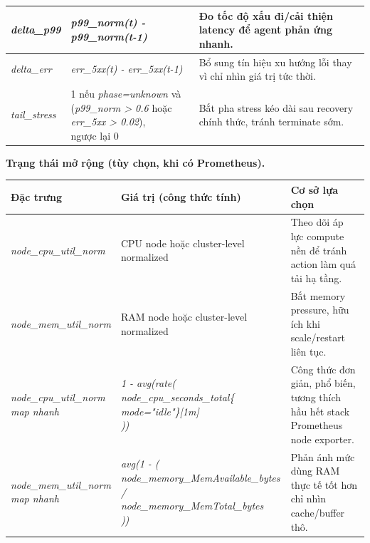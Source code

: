 \begin{center}
\begin{tabular}{|>{\hspace{2pt}\raggedright\arraybackslash}p{}|>{\hspace{2pt}\raggedright\arraybackslash}p{}|>{\hspace{2pt}\raggedright\arraybackslash}p{}|}
\textit{delta\_p99} & \textit{p99\_norm(t) - p99\_norm(t-1)} & Đo tốc độ xấu đi/cải thiện latency để agent phản ứng nhanh. \\ \hline
\textit{delta\_err} & \textit{err\_5xx(t) - err\_5xx(t-1)} & Bổ sung tín hiệu xu hướng lỗi thay vì chỉ nhìn giá trị tức thời. \\ \hline
\textit{tail\_stress} & \makecell[l]{1 nếu \textit{phase=unknown} và \\ (\textit{p99\_norm > 0.6} hoặc \textit{err\_5xx > 0.02}), \\ ngược lại 0} & Bắt pha stress kéo dài sau recovery chính thức, tránh terminate sớm. \\ \hline
\end{tabular}
\end{center}

\noindent \textbf{Trạng thái mở rộng (tùy chọn, khi có Prometheus).}
\begin{center}
\setlength{\tabcolsep}{4pt}
\renewcommand{\arraystretch}{1.3}
\begin{tabular}{|>{\hspace{2pt}\raggedright\arraybackslash}p{}|>{\hspace{2pt}\raggedright\arraybackslash}p{}|>{\hspace{2pt}\raggedright\arraybackslash}p{}|}
\hline
\textbf{Đặc trưng} & \textbf{Giá trị (công thức tính)} & \textbf{Cơ sở lựa chọn} \\ \hline
\textit{node\_cpu\_util\_norm} & CPU node hoặc cluster-level normalized & Theo dõi áp lực compute nền để tránh action làm quá tải hạ tầng. \\ \hline
\textit{node\_mem\_util\_norm} & RAM node hoặc cluster-level normalized & Bắt memory pressure, hữu ích khi scale/restart liên tục. \\ \hline
\makecell[l]{\textit{node\_cpu\_util\_norm}\\ \textit{map nhanh}} & \makecell[l]{\textit{1 - avg(rate(}\\ \textit{node\_cpu\_seconds\_total\{}\\ \textit{mode="idle"\}[1m]}\\ \textit{))}} & Công thức đơn giản, phổ biến, tương thích hầu hết stack Prometheus node exporter. \\ \hline
\makecell[l]{\textit{node\_mem\_util\_norm}\\ \textit{map nhanh}} & \makecell[l]{\textit{avg(1 - (}\\ \textit{node\_memory\_MemAvailable\_bytes /}\\ \textit{node\_memory\_MemTotal\_bytes}\\ \textit{))}} & Phản ánh mức dùng RAM thực tế tốt hơn chỉ nhìn cache/buffer thô. \\ \hline
\end{tabular}
\end{center}

